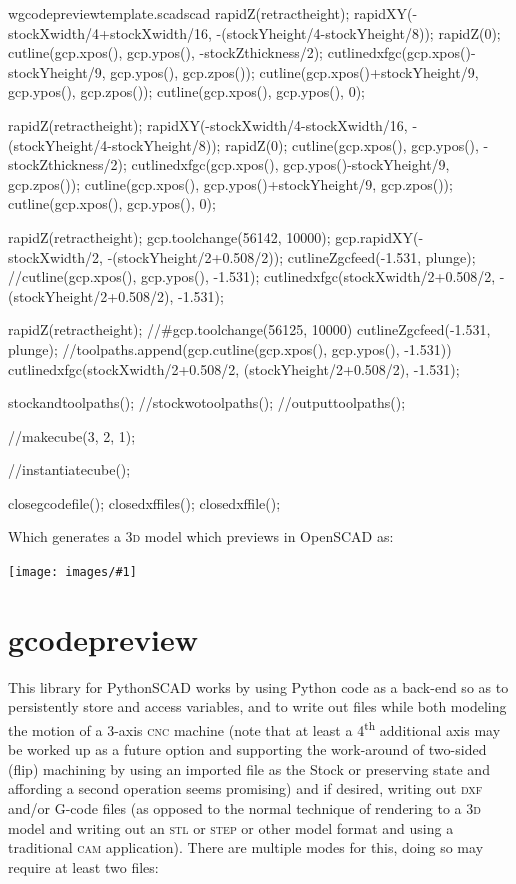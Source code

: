 \documentclass{ltxdoc}
\newcommand{\includeimage}[1]{\bigskip\noindent\texttt{[image: images/\#1]}\bigskip}
\begin{document}
\begin{writecode}{w}{gcodepreviewtemplate.scad}{scad}
rapidZ(retractheight);
rapidXY(-stockXwidth/4+stockXwidth/16, -(stockYheight/4-stockYheight/8));
rapidZ(0);
cutline(gcp.xpos(), gcp.ypos(), -stockZthickness/2);
cutlinedxfgc(gcp.xpos()-stockYheight/9, gcp.ypos(), gcp.zpos());
cutline(gcp.xpos()+stockYheight/9, gcp.ypos(), gcp.zpos());
cutline(gcp.xpos(), gcp.ypos(), 0);

rapidZ(retractheight);
rapidXY(-stockXwidth/4-stockXwidth/16, -(stockYheight/4-stockYheight/8));
rapidZ(0);
cutline(gcp.xpos(), gcp.ypos(), -stockZthickness/2);
cutlinedxfgc(gcp.xpos(), gcp.ypos()-stockYheight/9, gcp.zpos());
cutline(gcp.xpos(), gcp.ypos()+stockYheight/9, gcp.zpos());
cutline(gcp.xpos(), gcp.ypos(), 0);



rapidZ(retractheight);
gcp.toolchange(56142, 10000);
gcp.rapidXY(-stockXwidth/2, -(stockYheight/2+0.508/2));
cutlineZgcfeed(-1.531, plunge);
//cutline(gcp.xpos(), gcp.ypos(), -1.531);
cutlinedxfgc(stockXwidth/2+0.508/2, -(stockYheight/2+0.508/2), -1.531);

rapidZ(retractheight);
//#gcp.toolchange(56125, 10000)
cutlineZgcfeed(-1.531, plunge);
//toolpaths.append(gcp.cutline(gcp.xpos(), gcp.ypos(), -1.531))
cutlinedxfgc(stockXwidth/2+0.508/2, (stockYheight/2+0.508/2), -1.531);

stockandtoolpaths();
//stockwotoolpaths();
//outputtoolpaths();

//makecube(3, 2, 1);

//instantiatecube();

closegcodefile();
closedxffiles();
closedxffile();

\end{writecode}
\addtocounter{gcptmpl}{273}

\begin{samepage}
\noindent Which generates a \textsc{3d} model which previews in OpenSCAD as:

\bigskip

\includeimage{gcodepreview_unittests_scad.png}
\end{samepage}

\section{gcodepreview}

This library for PythonSCAD works by using Python code as a back-end so as to persistently store and access variables, and to write out files while both modeling the motion of a 3-axis \textsc{cnc} machine (note that at least a 4\textsuperscript{th} additional axis may be worked up as a future option and supporting the work-around of two-sided (flip) machining by using an imported file as the Stock or preserving state and affording a second operation seems promising) and if desired, writing out \textsc{dxf} and/or G-code files (as opposed to the normal technique of rendering to a \textsc{3d} model and writing out an \textsc{stl} or \textsc{step} or other model format and using a traditional \textsc{cam} application). There are multiple modes for this, doing so may require at least two files:
\end{document}
